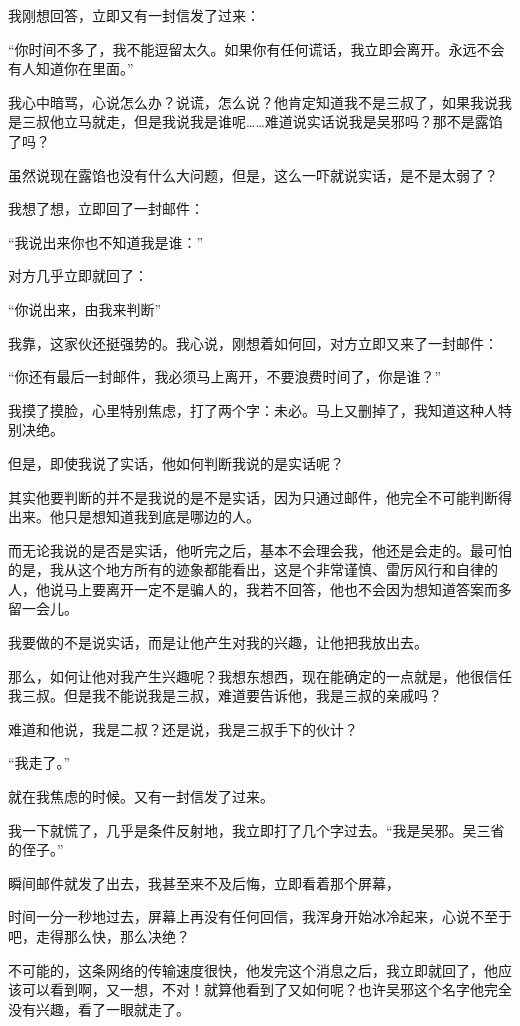 我刚想回答，立即又有一封信发了过来：

“你时间不多了，我不能逗留太久。如果你有任何谎话，我立即会离开。永远不会有人知道你在里面。”

我心中暗骂，心说怎么办？说谎，怎么说？他肯定知道我不是三叔了，如果我说我是三叔他立马就走，但是我说我是谁呢……难道说实话说我是吴邪吗？那不是露馅了吗？

虽然说现在露馅也没有什么大问题，但是，这么一吓就说实话，是不是太弱了？

我想了想，立即回了一封邮件：

“我说出来你也不知道我是谁：”

对方几乎立即就回了：

“你说出来，由我来判断”

我靠，这家伙还挺强势的。我心说，刚想着如何回，对方立即又来了一封邮件：

“你还有最后一封邮件，我必须马上离开，不要浪费时间了，你是谁？”

我摸了摸脸，心里特别焦虑，打了两个字：未必。马上又删掉了，我知道这种人特别决绝。

但是，即使我说了实话，他如何判断我说的是实话呢？

其实他要判断的并不是我说的是不是实话，因为只通过邮件，他完全不可能判断得出来。他只是想知道我到底是哪边的人。

而无论我说的是否是实话，他听完之后，基本不会理会我，他还是会走的。最可怕的是，我从这个地方所有的迹象都能看出，这是个非常谨慎、雷厉风行和自律的人，他说马上要离开一定不是骗人的，我若不回答，他也不会因为想知道答案而多留一会儿。

我要做的不是说实话，而是让他产生对我的兴趣，让他把我放出去。

那么，如何让他对我产生兴趣呢？我想东想西，现在能确定的一点就是，他很信任我三叔。但是我不能说我是三叔，难道要告诉他，我是三叔的亲戚吗？

难道和他说，我是二叔？还是说，我是三叔手下的伙计？

“我走了。”

就在我焦虑的时候。又有一封信发了过来。

我一下就慌了，几乎是条件反射地，我立即打了几个字过去。“我是吴邪。吴三省的侄子。”

瞬间邮件就发了出去，我甚至来不及后悔，立即看着那个屏幕，

时间一分一秒地过去，屏幕上再没有任何回信，我浑身开始冰冷起来，心说不至于吧，走得那么快，那么决绝？

不可能的，这条网络的传输速度很快，他发完这个消息之后，我立即就回了，他应该可以看到啊，又一想，不对！就算他看到了又如何呢？也许吴邪这个名字他完全没有兴趣，看了一眼就走了。

